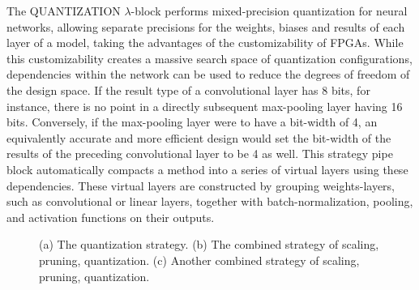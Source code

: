 The QUANTIZATION $\lambda$-block performs mixed-precision quantization for neural networks, allowing separate precisions for the weights, biases and results of each layer of a model, taking the advantages of the customizability of FPGAs. While this customizability creates a massive search space of quantization configurations, dependencies within the network can be used to reduce the degrees of freedom of the design space. If the result type of a convolutional layer has 8 bits, for instance, there is no point in a directly subsequent max-pooling layer having 16 bits. Conversely, if the max-pooling layer were to have a bit-width of 4, an equivalently accurate and more efficient design would set the bit-width of the results of the preceding convolutional layer to be 4 as well. This strategy pipe block automatically compacts a method into a series of virtual layers using these dependencies. These virtual layers are constructed by grouping weights-layers, such as convolutional or linear layers, together with batch-normalization, pooling, and activation functions on their outputs.


\begin{figure} 
   \centering
\hspace*{\fill}
  \hspace*{\fill}
  \hspace*{\fill}
   \hspace*{\fill}
  \caption{ (a) The quantization strategy. (b) The combined strategy of scaling, pruning, quantization. (c) Another combined strategy of scaling, pruning, quantization.  }
  \label{fig:combined_strategy} 
\end{figure}


